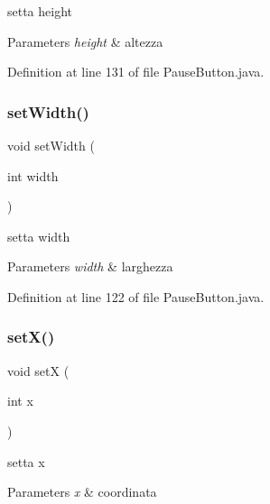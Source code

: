 setta height 


\begin{DoxyParams}{Parameters}
{\em height} & altezza \\
\hline
\end{DoxyParams}


Definition at line 131 of file Pause\+Button.\+java.

\mbox{\label{classui_1_1_pause_button_a8b4c8bccc530aa0a9b0139e04913af32}} 
\subsubsection{\texorpdfstring{set\+Width()}{setWidth()}}
{\footnotesize\ttfamily void set\+Width (\begin{DoxyParamCaption}\item[{int}]{width }\end{DoxyParamCaption})}



setta width 


\begin{DoxyParams}{Parameters}
{\em width} & larghezza \\
\hline
\end{DoxyParams}


Definition at line 122 of file Pause\+Button.\+java.

\mbox{\label{classui_1_1_pause_button_add2578ea6b65ad27a905a6d2048748bb}} 
\subsubsection{\texorpdfstring{set\+X()}{setX()}}
{\footnotesize\ttfamily void setX (\begin{DoxyParamCaption}\item[{int}]{x }\end{DoxyParamCaption})}



setta x 


\begin{DoxyParams}{Parameters}
{\em x} & coordinata \\
\hline
\end{DoxyParams}


